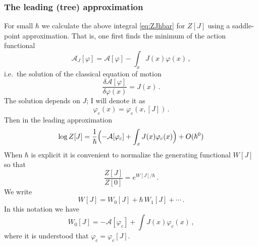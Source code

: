 \subsubsection*{The leading (tree) approximation}

For small $\hbar$ we calculate the above integral \eqref{eq:ZJhbar} for $Z[J]$
using a saddle-point approximation. That is, one first finds the minimum of the
action functional
\[
\mathcal A_J[\varphi]=\mathcal A[\varphi]-\int_xJ(x)\varphi(x)\,,
\]
i.e.\ the solution of the classical equation of motion
\[
\frac{\delta\mathcal A[\varphi]}{\delta\varphi(x)}=J(x)\,.
\]
The solution depends on $J$; I will denote it as
\[
\varphi_c(x)=\varphi_c(x,[J])\,.
\]
Then in the leading approximation
\[
\log Z[J]=\frac1\hbar\Bigl(-\mathcal A[\varphi_c]+\int_xJ(x)\varphi_c(x)\Bigr)+O(\hbar^0)
\]
When $\hbar$ is explicit it is convenient to normalize the generating
functional $W[J]$ so that
\[
\frac{Z[J]}{Z[0]}=e^{W[J]/\hbar}\,.
\]
We write
\[
W[J]=W_0[J]+\hbar\,W_1[J]+\cdots\,.
\]
In this notation we have
\begin{equation}\label{eq:W0}
W_0[J]=-\mathcal A[\varphi_c]+\int J(x)\varphi_c(x)\,,
\end{equation}
where it is understood that $\varphi_c=\varphi_c[J]$.

